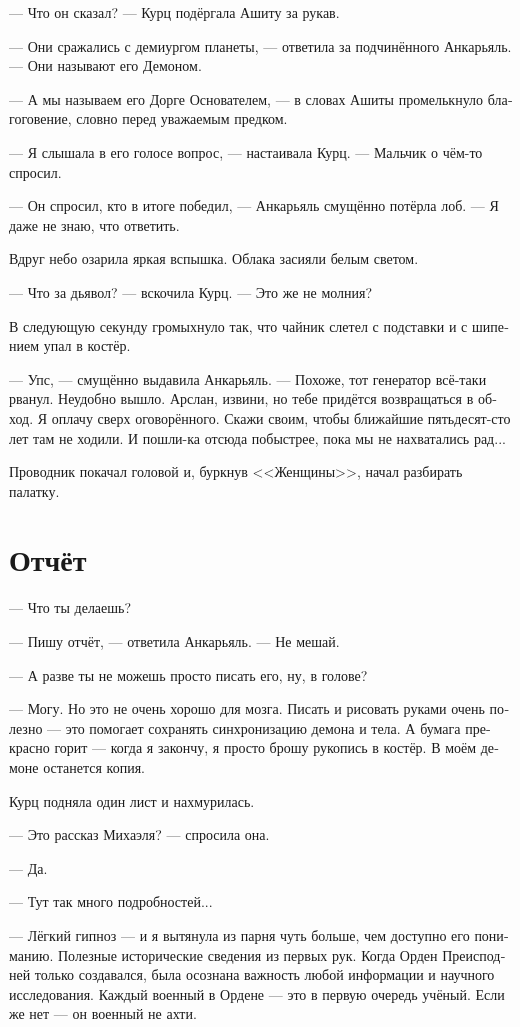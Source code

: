 \documentclass[a4paper,10pt,fleqn]{book}\usepackage{polyglossia}\setdefaultlanguage[babelshorthands=true]{russian}\setotherlanguage{english}\defaultfontfeatures{Ligatures=TeX,Mapping=tex-text}\usepackage{xcolor}\newcommand{\ml}[3]{#2}
\begin{document}
--- Что он сказал? --- Курц подёргала Ашиту за рукав.

--- Они сражались с демиургом планеты, --- ответила за подчинённого Анкарьяль.
--- Они называют его Демоном.

--- А мы называем его Дорге Основателем, --- в словах Ашиты промелькнуло благоговение, словно перед уважаемым предком.

--- Я слышала в его голосе вопрос, --- настаивала Курц.
--- Мальчик о чём-то спросил.

--- Он спросил, кто в итоге победил, --- Анкарьяль смущённо потёрла лоб.
--- Я даже не знаю, что ответить.

Вдруг небо озарила яркая вспышка.
Облака засияли белым светом.

--- Что за дьявол? --- вскочила Курц.
--- Это же не молния?

В следующую секунду громыхнуло так, что чайник слетел с подставки и с шипением упал в костёр.

--- Упс, --- смущённо выдавила Анкарьяль.
--- Похоже, тот генератор всё-таки рванул.
Неудобно вышло.
Арслан, извини, но тебе придётся возвращаться в обход.
Я оплачу сверх оговорённого.
Скажи своим, чтобы ближайшие пятьдесят-сто лет там не ходили.
И пошли-ка отсюда побыстрее, пока мы не нахватались рад...

Проводник покачал головой и, буркнув <<Женщины>>, начал разбирать палатку.

\section{Отчёт}

--- Что ты делаешь?

--- Пишу отчёт, --- ответила Анкарьяль.
--- Не мешай.

--- А разве ты не можешь просто писать его, ну, в голове?

--- Могу.
Но это не очень хорошо для мозга.
Писать и рисовать руками очень полезно --- это помогает сохранять синхронизацию демона и тела.
А бумага прекрасно горит --- когда я закончу, я просто брошу рукопись в костёр.
В моём демоне останется копия.

Курц подняла один лист и нахмурилась.

--- Это рассказ Михаэля? --- спросила она.

--- Да.

--- Тут так много подробностей...

--- Лёгкий гипноз --- и я вытянула из парня чуть больше, чем доступно его пониманию.
Полезные исторические сведения из первых рук.
Когда Орден Преисподней только создавался, была осознана важность любой информации и научного исследования.
\ml{$0$}
{Каждый военный в Ордене --- это в первую очередь учёный.}
{Every military in the Order is a scientist in the first place.}
\ml{$0$}
{Если же нет --- он военный не ахти.}
{Otherwise, they're not much of a military.''}
\end{document}
